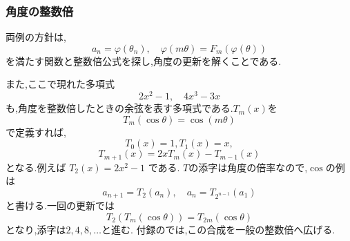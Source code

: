  \subsubsection{角度の整数倍}\label{節：整数倍の公式へ}
    両例の方針は,
    \[
      a_n=\varphi(\theta_n),
      \quad
      \varphi(m\theta)=F_m(\varphi(\theta))
    \]
    を満たす関数と整数倍公式を探し,角度の更新を解くことである.

    また,ここで現れた多項式
    \[
      2x^2-1,
      \quad
      4x^3-3x
    \]
    も,角度を整数倍したときの余弦を表す多項式である.$T_m(x)$を
    \[
      T_m(\cos\theta)=\cos(m\theta)
    \]
    で定義すれば,
    \[
      T_0(x)=1,  T_1(x)=x,
    \]
    \[
      T_{m+1}(x)=2xT_m(x)-T_{m-1}(x)
    \]
    となる.例えば $T_2(x)=2x^2-1$ である.
    $T$の添字は角度の倍率なので,$\cos$の例は
    \[
      a_{n+1}=T_2(a_n),
      \quad
      a_n=T_{2^{n-1}}(a_1)
    \]
    と書ける.一回の更新では
    \[
      T_2(T_m(\cos\theta))=T_{2m}(\cos\theta)
    \]
    となり,添字は$2,4,8,\ldots$と進む.
    付録のでは,この合成を一般の整数倍へ広げる.

